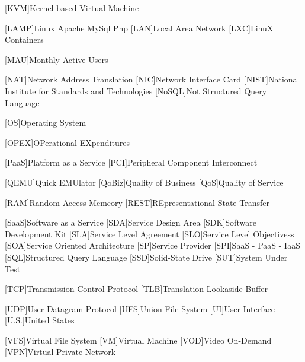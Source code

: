 [KVM]{Kernel-based Virtual Machine}

[LAMP]{Linux Apache MySql Php}
[LAN]{Local Area Network}
[LXC]{LinuX Containers}

[MAU]{Monthly Active Users}

[NAT]{Network Address Translation}
[NIC]{Network Interface Card}
[NIST]{National Institute for Standards and Technologies}
[NoSQL]{Not Structured Query Language}

[OS]{Operating System}

[OPEX]{OPerational EXpenditures}

[PaaS]{Platform as a Service}
[PCI]{Peripheral Component Interconnect}

[QEMU]{Quick EMUlator}
[QoBiz]{Quality of Business}
[QoS]{Quality of Service}

[RAM]{Random Access Memeory}
[REST]{REpresentational State Transfer}

[SaaS]{Software as a Service}
[SDA]{Service Design Area}
[SDK]{Software Development Kit}
[SLA]{Service Level Agreement}
[SLO]{Service Level Objectivess}
[SOA]{Service Oriented Architecture}
[SP]{Service Provider}
[SPI]{SaaS - PaaS - IaaS}
[SQL]{Structured Query Language}
[SSD]{Solid-State Drive}
[SUT]{System Under Test}

[TCP]{Transmission Control Protocol}
[TLB]{Translation Lookaside Buffer}

[UDP]{User Datagram Protocol}
[UFS]{Union File System}
[UI]{User Interface}
[U.S.]{United States}

[VFS]{Virtual File System}
[VM]{Virtual Machine}
[VOD]{Video On-Demand}
[VPN]{Virtual Private Network}